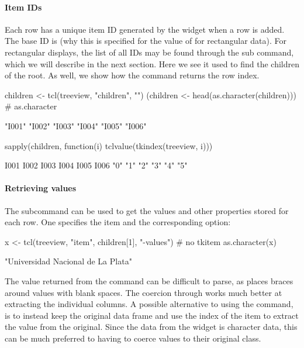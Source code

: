 \paragraph{Item IDs}
Each row has a unique item ID generated by the widget when a row is
added. The base ID is \qcode{} (why this is specified for the value of
 for rectangular data). For rectangular displays, the
list of all IDs may be found through the 
sub command, which we will describe in the next section.  Here we see
it used to find the children of the root. As well, we show how the
 command returns the row index.
\begin{Schunk}
\begin{Sinput}
 children <- tcl(treeview, "children", "")
 (children <- head(as.character(children)))     # as.character
\end{Sinput}
\begin{Soutput}
[1] "I001" "I002" "I003" "I004" "I005" "I006"
\end{Soutput}
\begin{Sinput}
 sapply(children, function(i) tclvalue(tkindex(treeview, i)))
\end{Sinput}
\begin{Soutput}
I001 I002 I003 I004 I005 I006 
 "0"  "1"  "2"  "3"  "4"  "5" 
\end{Soutput}
\end{Schunk}

\paragraph{Retrieving values}
The  subcommand can be used to get the
values and other properties stored for each row. One specifies the item and the
corresponding option:
\begin{Schunk}
\begin{Sinput}
 x <- tcl(treeview, "item", children[1], "-values") # no tkitem
 as.character(x)
\end{Sinput}
\begin{Soutput}
[1] "Universidad Nacional de La Plata"
\end{Soutput}
\end{Schunk}
%
The value returned from the  command can be difficult to
parse, as \TCL\/ places braces around values with blank spaces. The coercion through
 works much better at extracting the individual
columns. A possible alternative to using the  command, is
to instead keep the original data frame and use the index of the item
to extract the value from the original. Since the data from the widget
is character data, this can be much preferred to having to coerce
values to their original class.

